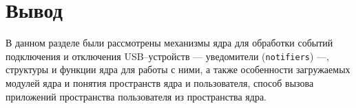 \section*{Вывод}

В данном разделе были рассмотрены механизмы ядра для обработки событий подключения и отключения USB--устройств --- уведомители (\texttt{notifiers}) ---, структуры и функции ядра для работы с ними, а также особенности загружаемых модулей ядра и понятия пространств ядра и пользователя, способ вызова приложений пространства пользователя из пространства ядра.